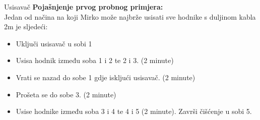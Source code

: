 \begin{statement}[
  problempoints=100,
  timelimit=1 sekunda,
  memorylimit=512 MiB,
]{Usisavač}
\textbf{Pojašnjenje prvog probnog primjera:}\\

Jedan od načina na koji Mirko može najbrže usisati sve hodnike s duljinom kabla 2m je sljedeći:
\begin{itemize}
	\item Uključi usisavač u sobi 1
	\item Usisa hodnik između soba 1 i 2 te 2 i 3. (2 minute)
	\item Vrati se nazad do sobe 1 gdje iskljući usisavač. (2 minute)
	\item Prošeta se do sobe 3. (2 minute)
	\item Usise hodnike između soba 3 i 4 te 4 i 5 (2 minute). Završi čišćenje u sobi 5.
\end{itemize}

\end{statement}


